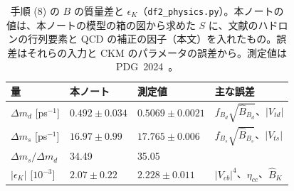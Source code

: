 \documentclass[a4paper,10pt]{ltjsarticle}
\begin{document}
\begin{table}[tbp]
\centering\small
\caption{手順 (8) の $B$ の質量差と $\epsilon_K$（\texttt{df2\_physics.py}）。本ノートの値は、本ノートの模型の箱の図から求めた $S$ に、文献のハドロンの行列要素と QCD の補正の因子（本文）を入れたもの。誤差はそれらの入力と CKM のパラメータの誤差から。測定値は PDG~2024~\cite{pdg24}。}
\label{tab:df2}
\begin{tabular}{llll}
\toprule
量 & 本ノート & 測定値 & 主な誤差 \\
\midrule
$\Delta m_d$ [ps$^{-1}$] & $0.492\pm0.034$ & $0.5069\pm0.0021$ & $f_{B_d}\sqrt{\hat B_{B_d}}$、$|V_{td}|$ \\
$\Delta m_s$ [ps$^{-1}$] & $16.97\pm0.99$ & $17.765\pm0.006$ & $f_{B_s}\sqrt{\hat B_{B_s}}$、$|V_{ts}|$ \\
$\Delta m_s/\Delta m_d$ & 34.49 & 35.05 & \\
$|\epsilon_K|$ [$10^{-3}$] & $2.07\pm0.22$ & $2.228\pm0.011$ & $|V_{cb}|^4$、$\eta_{cc}$、$\hat B_K$ \\
\bottomrule
\end{tabular}
\end{table}
\end{document}
